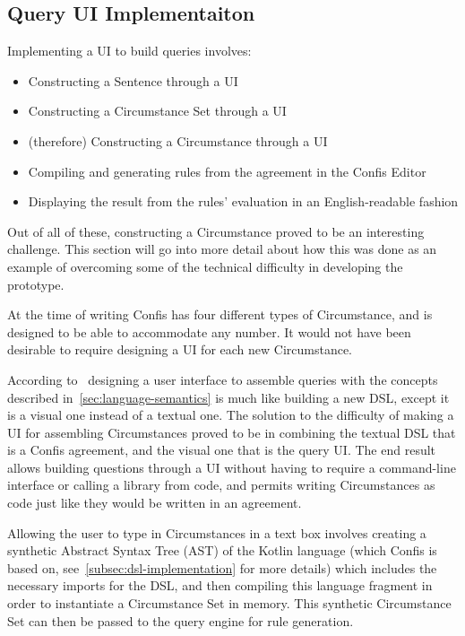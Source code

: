 \subsection{Query UI Implementaiton}\label{subsec:query-ui-implementaiton}

Implementing a UI to build queries involves:
\begin{itemize}
    \item Constructing a Sentence through a UI
    \item Constructing a Circumstance Set through a UI
    \item (therefore) Constructing a Circumstance through a UI
    \item Compiling and generating rules from the agreement in the Confis Editor
    \item Displaying the result from the rules' evaluation in an English-readable fashion
\end{itemize}

Out of all of these, constructing a Circumstance proved to be an interesting challenge.
This section will go into more detail about how this was done as an example of overcoming some of the technical difficulty in developing the prototype.

At the time of writing Confis has four different types of Circumstance, and is designed to be able to accommodate any number.
It would not have been desirable to require designing a UI for each new Circumstance.

According to~\cite{fowlerLangWorkbench} designing a user interface to assemble queries with the concepts described in~\autoref{sec:language-semantics} is much like building a new DSL, except it is a visual one instead of a textual one.
The solution to the difficulty of making a UI for assembling Circumstances proved to be in combining the textual DSL that is a Confis agreement, and the visual one that is the query UI\@.
The end result allows building questions through a UI without having to require a command-line interface or calling a library from code, and permits writing Circumstances as code just like they would be written in an agreement.

Allowing the user to type in Circumstances in a text box involves creating a synthetic Abstract Syntax Tree (AST) of the Kotlin language (which Confis is based on, see~\autoref{subsec:dsl-implementation} for more details) which includes the necessary imports for the DSL, and then compiling this language fragment in order to instantiate a Circumstance Set in memory.
This synthetic Circumstance Set can then be passed to the query engine for rule generation.

